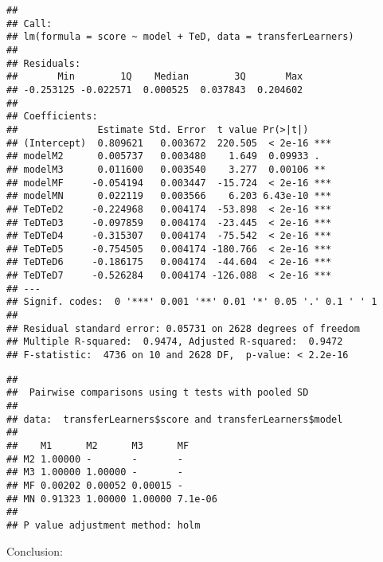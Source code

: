 \documentclass[]{article}
\newenvironment{Shaded}{\begin{snugshade}}{\end{snugshade}}
\newcommand{\KeywordTok}[1]{\textcolor[rgb]{0.13,0.29,0.53}{\textbf{#1}}}
\newcommand{\CommentTok}[1]{\textcolor[rgb]{0.56,0.35,0.01}{\textit{#1}}}
\newcommand{\OperatorTok}[1]{\textcolor[rgb]{0.81,0.36,0.00}{\textbf{#1}}}
\newcommand{\NormalTok}[1]{#1}
\begin{document}
\begin{verbatim}
## 
## Call:
## lm(formula = score ~ model + TeD, data = transferLearners)
## 
## Residuals:
##       Min        1Q    Median        3Q       Max 
## -0.253125 -0.022571  0.000525  0.037843  0.204602 
## 
## Coefficients:
##              Estimate Std. Error  t value Pr(>|t|)    
## (Intercept)  0.809621   0.003672  220.505  < 2e-16 ***
## modelM2      0.005737   0.003480    1.649  0.09933 .  
## modelM3      0.011600   0.003540    3.277  0.00106 ** 
## modelMF     -0.054194   0.003447  -15.724  < 2e-16 ***
## modelMN      0.022119   0.003566    6.203 6.43e-10 ***
## TeDTeD2     -0.224968   0.004174  -53.898  < 2e-16 ***
## TeDTeD3     -0.097859   0.004174  -23.445  < 2e-16 ***
## TeDTeD4     -0.315307   0.004174  -75.542  < 2e-16 ***
## TeDTeD5     -0.754505   0.004174 -180.766  < 2e-16 ***
## TeDTeD6     -0.186175   0.004174  -44.604  < 2e-16 ***
## TeDTeD7     -0.526284   0.004174 -126.088  < 2e-16 ***
## ---
## Signif. codes:  0 '***' 0.001 '**' 0.01 '*' 0.05 '.' 0.1 ' ' 1
## 
## Residual standard error: 0.05731 on 2628 degrees of freedom
## Multiple R-squared:  0.9474, Adjusted R-squared:  0.9472 
## F-statistic:  4736 on 10 and 2628 DF,  p-value: < 2.2e-16
\end{verbatim}

\begin{Shaded}
\end{Shaded}

\begin{verbatim}
## 
##  Pairwise comparisons using t tests with pooled SD 
## 
## data:  transferLearners$score and transferLearners$model 
## 
##    M1      M2      M3      MF     
## M2 1.00000 -       -       -      
## M3 1.00000 1.00000 -       -      
## MF 0.00202 0.00052 0.00015 -      
## MN 0.91323 1.00000 1.00000 7.1e-06
## 
## P value adjustment method: holm
\end{verbatim}

Conclusion:
\end{document}
